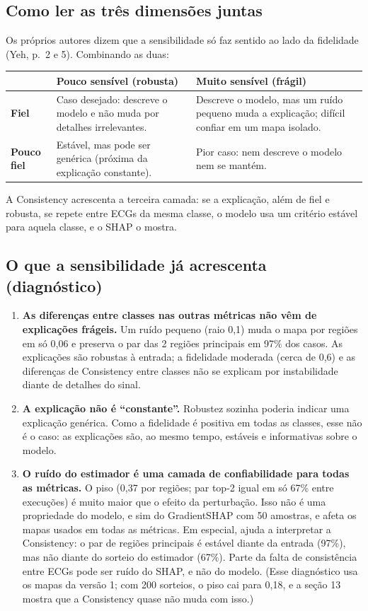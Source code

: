 \documentclass[11pt,a4paper]{article}
\begin{document}
\subsection{Como ler as três dimensões juntas}
Os próprios autores dizem que a sensibilidade só faz sentido ao lado da fidelidade (Yeh, p.~2 e 5). Combinando as duas:
\begin{center}\small
\begin{tabularx}{\linewidth}{lXX}
\toprule
& \textbf{Pouco sensível (robusta)} & \textbf{Muito sensível (frágil)} \\
\midrule
\textbf{Fiel} & Caso desejado: descreve o modelo e não muda por detalhes irrelevantes. & Descreve o modelo, mas um ruído pequeno muda a explicação; difícil confiar em um mapa isolado. \\
\addlinespace
\textbf{Pouco fiel} & Estável, mas pode ser genérica (próxima da explicação constante). & Pior caso: nem descreve o modelo nem se mantém. \\
\bottomrule
\end{tabularx}
\end{center}
A Consistency acrescenta a terceira camada: se a explicação, além de fiel e robusta, se repete entre ECGs da mesma classe, o modelo usa um critério estável para aquela classe, e o SHAP o mostra.

\subsection{O que a sensibilidade já acrescenta (diagnóstico)}
\begin{enumerate}
\item \textbf{As diferenças entre classes nas outras métricas não vêm de explicações frágeis.} Um ruído pequeno (raio 0,1) muda o mapa por regiões em só 0,06 e preserva o par das 2 regiões principais em 97\% dos casos. As explicações são robustas à entrada; a fidelidade moderada (cerca de 0,6) e as diferenças de Consistency entre classes não se explicam por instabilidade diante de detalhes do sinal.
\item \textbf{A explicação não é “constante”.} Robustez sozinha poderia indicar uma explicação genérica. Como a fidelidade é positiva em todas as classes, esse não é o caso: as explicações são, ao mesmo tempo, estáveis e informativas sobre o modelo.
\item \textbf{O ruído do estimador é uma camada de confiabilidade para todas as métricas.} O piso (0,37 por regiões; par top-2 igual em só 67\% entre execuções) é muito maior que o efeito da perturbação. Isso não é uma propriedade do modelo, e sim do GradientSHAP com 50 amostras, e afeta os mapas usados em todas as métricas. Em especial, ajuda a interpretar a Consistency: o par de regiões principais é estável diante da entrada (97\%), mas não diante do sorteio do estimador (67\%). Parte da falta de consistência entre ECGs pode ser ruído do SHAP, e não do modelo. (Esse diagnóstico usa os mapas da versão 1; com 200 sorteios, o piso cai para 0,18, e a seção 13 mostra que a Consistency quase não muda com isso.)
\end{enumerate}
\end{document}
